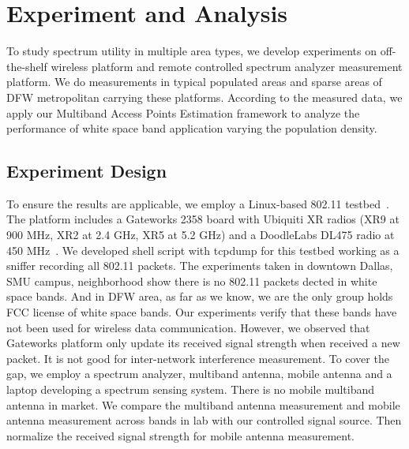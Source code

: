 \section{Experiment and Analysis}
\label{sec:experimentdesign}

To study spectrum utility in multiple area types, we develop experiments 
on off-the-shelf wireless platform and remote controlled spectrum analyzer measurement platform.
We do measurements in typical populated areas and sparse areas of DFW metropolitan carrying these platforms.
According to the measured data, we apply our Multiband Access Points Estimation framework to analyze
the performance of white space band application varying the population density.

\subsection{Experiment Design}
To ensure the results are applicable, we employ a Linux-based 802.11 testbed~\cite{Gateworks}.
The platform includes a Gateworks 2358 board with Ubiquiti XR radios (XR9 at 900 MHz, 
XR2 at 2.4 GHz, XR5 at 5.2 GHz) and a DoodleLabs DL475 radio at 450 MHz~\cite{Ubnt,Gateworks}.
We developed shell script with tcpdump for this testbed working as a sniffer recording all 
802.11 packets.
The experiments taken in downtown Dallas, SMU campus, neighborhood show there is no 802.11
packets dected in white space bands. And in DFW area, as far as we know, we are the only 
group holds FCC license of white space bands. Our experiments verify that these bands 
have not been used for wireless data communication.
However, we observed that Gateworks platform only update its received signal strength when received
a new packet. It is not good for inter-network interference measurement. To cover the gap, 
we employ a spectrum analyzer, multiband antenna, mobile antenna and a laptop developing a spectrum sensing 
system. There is no mobile multiband antenna in market. We compare the multiband antenna measurement
and mobile antenna measurement across bands in lab with our controlled signal source.
Then normalize the received signal strength for mobile antenna measurement.

